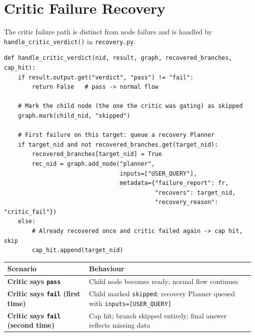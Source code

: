 \documentclass[12pt,a4paper]{article}
\begin{document}
\section{Critic Failure Recovery}

The critic failure path is distinct from node failure and is handled by
\mbox{\texttt{handle\_critic\_verdict()}} in \texttt{recovery.py}.

\begin{lstlisting}[style=pycode, caption={Critic-fail recovery — recovery.py:97--135}]
def handle_critic_verdict(nid, result, graph, recovered_branches, cap_hit):
    if result.output.get("verdict", "pass") != "fail":
        return False   # pass -> normal flow

    # Mark the child node (the one the critic was gating) as skipped
    graph.mark(child_nid, "skipped")

    # First failure on this target: queue a recovery Planner
    if target_nid and not recovered_branches.get(target_nid):
        recovered_branches[target_nid] = True
        rec_nid = graph.add_node("planner",
                                 inputs=["USER_QUERY"],
                                 metadata={"failure_report": fr,
                                           "recovers": target_nid,
                                           "recovery_reason": "critic_fail"})
    else:
        # Already recovered once and critic failed again -> cap hit, skip
        cap_hit.append(target_nid)
\end{lstlisting}

\begin{center}
\begin{tabular}{>{\bfseries}p{3.5cm} p{9.5cm}}
\toprule
Scenario & Behaviour \\
\midrule
Critic says \texttt{pass} & Child node becomes ready; normal flow continues \\
Critic says \texttt{fail} (first time) & Child marked \texttt{skipped}; recovery
  Planner queued with \texttt{inputs=[USER\_QUERY]} \\
Critic says \texttt{fail} (second time) & Cap hit; branch skipped entirely;
  final answer reflects missing data \\
\bottomrule
\end{tabular}
\end{center}

\end{document}
